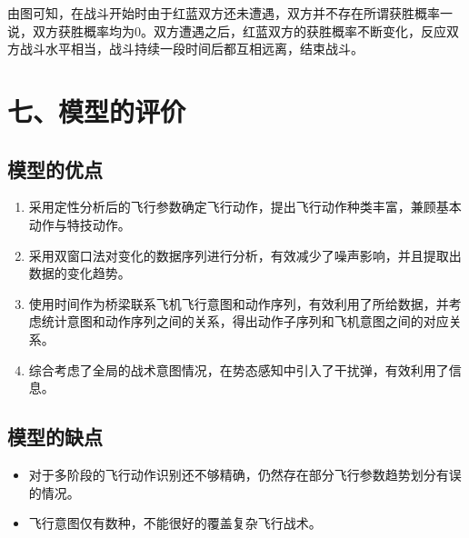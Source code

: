 \documentclass{my_paper}
\begin{document}
由图可知，在战斗开始时由于红蓝双方还未遭遇，双方并不存在所谓获胜概率一说，双方获胜概率均为0。双方遭遇之后，红蓝双方的获胜概率不断变化，反应双方战斗水平相当，战斗持续一段时间后都互相远离，结束战斗。


\section{七、模型的评价}


\subsection{模型的优点}
\begin{enumerate}
    \item 采用定性分析后的飞行参数确定飞行动作，提出飞行动作种类丰富，兼顾基本动作与特技动作。
    \item 采用双窗口法对变化的数据序列进行分析，有效减少了噪声影响，并且提取出数据的变化趋势。
    \item 使用时间作为桥梁联系飞机飞行意图和动作序列，有效利用了所给数据，并考虑统计意图和动作序列之间的关系，得出动作子序列和飞机意图之间的对应关系。
    \item 综合考虑了全局的战术意图情况，在势态感知中引入了干扰弹，有效利用了信息。

\end{enumerate}

\subsection{模型的缺点}
\begin{itemize}
    \item 对于多阶段的飞行动作识别还不够精确，仍然存在部分飞行参数趋势划分有误的情况。
    \item 飞行意图仅有数种，不能很好的覆盖复杂飞行战术。
\end{itemize}

\newpage
\begin{center}
\end{center}

\newpage
\end{document}
